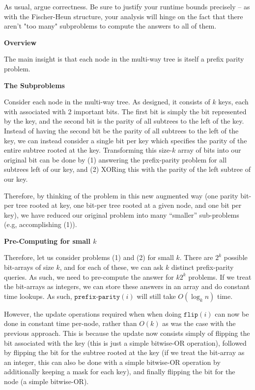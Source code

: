 \documentclass[12pt]{exam}
\newcommand*{\bigo}[1]{O\left( #1 \right)}
\begin{document}
\begin{questions}
\begin{parts}
As usual, argue correctness. Be sure to justify your runtime bounds precisely -- as with the Fischer-Heun structure, your analysis will hinge on the fact that there aren't "too many" subproblems to compute the answers to all of them.

\begin{solution}
\textbf{Overview}

The main insight is that each node in the multi-way tree is itself a prefix parity problem. 

\textbf{The Subproblems}

Consider each node in the multi-way tree. As designed, it consists of $k$ keys, each with associated with 2 important bits. The first bit is simply the bit represented by the key, and the second bit is the parity of all subtrees to the left of the key. Instead of having the second bit be the parity of all subtrees to the left of the key, we can instead consider a single bit per key which specifies the parity of the entire subtree rooted at the key. Transforming this size-$k$ array of bits into our original bit can be done by (1) answering the prefix-parity problem for all subtrees left of our key, and (2) XORing this with the parity of the left subtree of our key.


Therefore, by thinking of the problem in this new augmented way (one parity bit-per tree rooted at key, one bit-per tree rooted at a given node, and one bit per key), we have reduced our original problem into many ``smaller'' sub-problems (e.g, accomplishing (1)).

\textbf{Pre-Computing for small $k$}

Therefore, let us consider problems (1) and (2) for small $k$. There are $2^k$ possible bit-arrays of size $k$, and for each of these, we can ask $k$ distinct prefix-parity queries. As such, we need to pre-compute the answer for $k2^k$ problems. If we treat the bit-arrays as integers, we can store these answers in an array and do constant time lookups. As such, $\texttt{prefix-parity}(i)$ will still take $\bigo{\log_k n}$ time.


However, the update operations required when when doing $\texttt{flip}(i)$ can now be done in constant time per-node, rather than $\bigo{k}$ as was the case with the previous approach. This is because the update now consists simply of flipping the bit associated with the key (this is just a simple bitwise-OR operation), followed by flipping the bit for the subtree rooted at the key (if we treat the bit-array as an integer, this can also be done with a simple bitwise-OR operation by additionally keeping a mask for each key), and finally flipping the bit for the node (a simple bitwise-OR). 



\end{solution}
\end{parts}
\end{questions}
\end{document}

